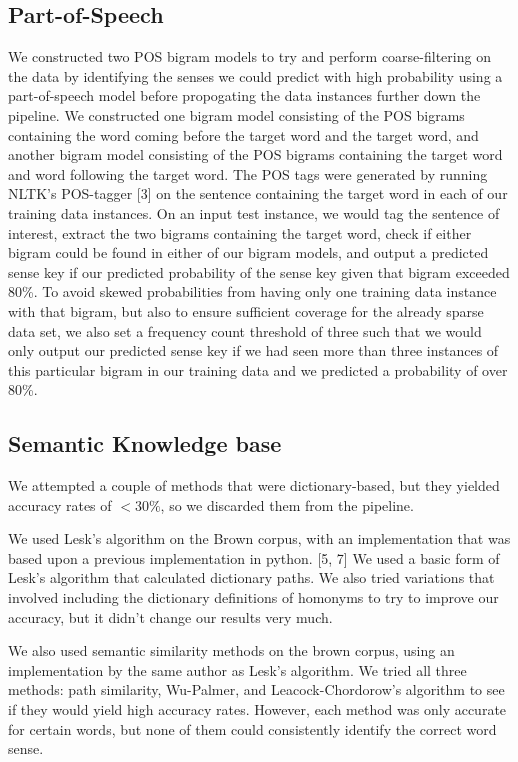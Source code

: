 \documentclass[10pt, letterpaper]{article}
\begin{document}
 	\subsection{Part-of-Speech}
 	We constructed two POS bigram models to try and perform coarse-filtering on the data by identifying the senses we could predict with high probability using a part-of-speech model before propogating the data instances further down the pipeline. We constructed one bigram model consisting of the POS bigrams containing the word coming before the target word and the target word, and another bigram model consisting of the POS bigrams containing the target word and word following the target word. The POS tags were generated by running NLTK's POS-tagger [3] on the sentence containing the target word in each of our training data instances. On an input test instance, we would tag the sentence of interest, extract the two bigrams containing the target word, check if either bigram could be found in either of our bigram models, and output a predicted sense key if our predicted probability of the sense key given that bigram exceeded 80\%. To avoid skewed probabilities from having only one training data instance with that bigram, but also to ensure sufficient coverage for the already sparse data set, we also set a frequency count threshold of three such that we would only output our predicted sense key if we had seen more than three instances of this particular bigram in our training data and we predicted a probability of over 80\%.
 	\subsection{Semantic Knowledge base}
        \indent We attempted a couple of methods that were dictionary-based, but they yielded accuracy rates of $ < 30\%$, so we discarded them from the pipeline.

        We used Lesk's algorithm on the Brown corpus, with an implementation that was based upon a previous implementation in python. [5, 7] We used a basic form of Lesk's algorithm that calculated dictionary paths. We also tried variations that involved including the dictionary definitions of homonyms to try to improve our accuracy, but it didn't change our results very much.

        We also used semantic similarity methods on the brown corpus, using an implementation by the same author as Lesk's algorithm. We tried all three methods: path similarity, Wu-Palmer, and Leacock-Chordorow's algorithm to see if they would yield high accuracy rates. However, each method was only accurate for certain words, but none of them could consistently identify the correct word sense.
        
\end{document}
